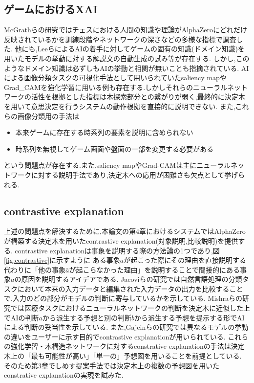 \subsection{ゲームにおけるXAI}
McGrathらの研究\cite{DeepMind}ではチェスにおける人間の知識や理論がAlphaZeroにどれだけ反映されているかを訓練段階やネットワークの深さなどの多様な指標で調査した.
他にも,Leeら\cite{DecodeChess}によるAIの着手に対してゲームの固有の知識(ドメイン知識)を用いたモデルの挙動に対する解説文の自動生成の試み等が存在する.
しかし,このようなドメイン知識は必ずしもAIの挙動と相関が無いことも指摘されている\cite{DeepMind}.
AIによる画像分類タスクの可視化手法として用いられていたsaliency map\cite{saliency}やGrad\_CAM\cite{Grad-CAM}を強化学習に用いる例も存在する\cite{gl}\cite{atari-saliency}\cite{visualize}.しかしそれらのニューラルネットワークの活性を根拠とした指標は木探索部分との繋がりが弱く,最終的に決定木を用いて意思決定を行うシステムの動作根拠を直接的に説明できない.
また,これらの画像分類用の手法は
\begin{itemize}
	\item 本来ゲームに存在する時系列の要素を説明に含められない
	\item 時系列を無視してゲーム画面や盤面の一部を変更する必要がある
\end{itemize}
という問題点が存在する.また,saliency mapやGrad-CAMは主にニューラルネットワークに対する説明手法であり,決定木への応用が困難さも欠点として挙げられる.

\subsection{contrastive explanation}
上述の問題点を解決するために,本論文の第4章におけるシステムではAlphaZeroが構築する決定木を用いたcontrastive explanation(対象説明,比較説明)を提供する.
contrastive explanationは事象を説明する際の方法論の1つであり,図\ref{fig:contrastive}に示すように
ある事象$a$が起こった際にその理由を直接説明する代わりに「他の事象$\bar{a}$が起こらなかった理由」を説明することで間接的にある事象$a$の原因を説明するアイデアである\cite{contrastive}.
Jacoviらの研究\cite{contrastive}では自然言語処理の分類タスクにおいて本来の入力データと編集された入力データの出力を比較することで,入力のどの部分がモデルの判断に寄与しているかを示している.
Mishraらの研究\cite{whyNot}では医療タスクにおけるニューラルネットワークの判断を決定木に近似した上でAIの判断$a$から派生する予想と別の判断$b$から派生する予想を提示する形でAIによる判断の妥当性を示している.
また,Gajcinらの研究\cite{preference}では異なるモデルの挙動の違いをユーザーに示す目的でcontrastive explanationが用いられている.
これらの強化学習・木構造ネットワークに対するconstrative explanationの手法は決定木上の「最も可能性が高い」「単一の」予想図を用いることを前提としている.
そのため第3章でしめす提案手法では決定木上の複数の予想図を用いたconstrative explanationの実現を試みた.

